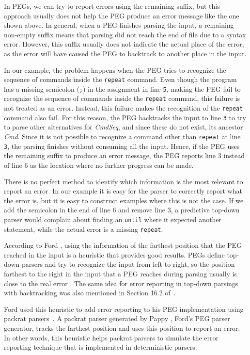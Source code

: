 \documentclass[3p,12pt,singlecolumn]{elsarticle}
\begin{document}
In PEGs, we can try to report errors using the remaining suffix, but
this approach usually does not help the PEG produce an error
message like the one shown above.
In general, when a PEG finishes parsing the input, a remaining non-empty suffix means that parsing did not reach the end of file due to a syntax error. However, this suffix usually does not indicate the
actual place of the error, as the error will have caused the PEG
to backtrack to another place in the input.

In our example, the problem happens when the PEG tries to recognize
the sequence of commands inside the \texttt{repeat} command.
Even though the program has a missing semicolon (\texttt{;}) in the
assignment in line \texttt{5}, making the PEG fail to recognize
the sequence of commands inside the \texttt{repeat} command, this
failure is not treated as an error.
Instead, this failure makes the recognition of the \texttt{repeat}
command also fail.
For this reason, the PEG backtracks the input to line \texttt{3}
to try to parse other alternatives for {\em CmdSeq},
and since these do not exist, its ancestor {\em Cmd}.
Since it is not possible to recognize a command other than
\texttt{repeat} at line \texttt{3},
the parsing finishes without consuming all the input.
Hence, if the PEG uses the remaining suffix to produce an error
message, the PEG reports line 3 instead of line 6 as the location 
where no further progress can be made.

There is no
perfect method to identify which information is the most relevant to
report an error. In our example it is easy for the parser to
correctly report what the error is, but it is easy to construct examples
where this is not the case. If we add the semicolon
in the end of line 6 and remove line 3, a predictive top-down parser
would complain about finding an {\tt until} where it expected 
another statement, while the actual error is a missing {\tt repeat}.

According to Ford \cite{ford2002packrat}, using the information of the farthest position
that the PEG reached in the input is a heuristic that provides
good results.
PEGs define top-down parsers and try to recognize
the input from left to right, so the position farthest to
the right in the input that a PEG reaches during parsing usually is
close to the real error \cite{ford2002packrat}. The same idea
for error reporting in top-down parsings with backtracking was
also mentioned in Section 16.2 of~\cite{grune2010ptp}. 

Ford used this heuristic to add error reporting to his PEG implementation using packrat parsers~\cite{ford2002packrat}.
A packrat parser generated by Pappy \cite{ford2002pappy}, Ford's PEG
parser generator, tracks the farthest position and uses this position
to report an error.
In other words, this heuristic helps packrat parsers to simulate the
error reporting technique that is implemented in deterministic parsers.
\end{document}
